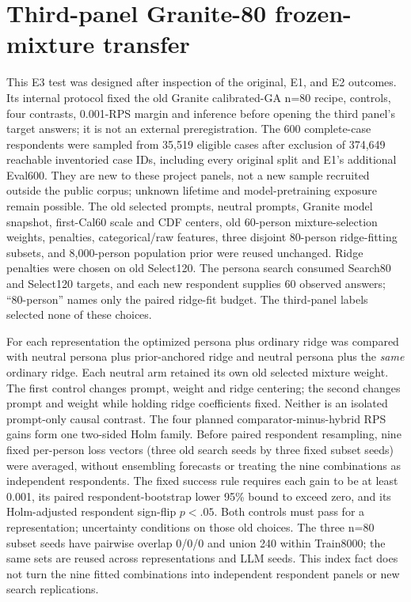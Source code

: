 \section{Third-panel Granite-80 frozen-mixture transfer}\label{sec:hybrid-transfer}
This E3 test was designed after inspection of the original, E1, and E2
outcomes. Its internal protocol fixed the old Granite calibrated-GA n=80
recipe, controls, four contrasts, 0.001-RPS margin and inference before
opening the third panel's target answers; it is not an external
preregistration. The 600 complete-case respondents were sampled from 35,519
eligible cases after exclusion of 374,649 reachable inventoried case IDs,
including every original split and E1's additional Eval600. They are new to
these project panels, not a new sample recruited outside the public corpus;
unknown lifetime and model-pretraining exposure remain possible. The old
selected prompts, neutral prompts, Granite model snapshot, first-Cal60 scale
and CDF centers, old 60-person mixture-selection weights, penalties,
categorical/raw features, three disjoint 80-person ridge-fitting subsets,
and 8,000-person population prior were reused unchanged. Ridge penalties
were chosen on old Select120. The persona search consumed Search80 and
Select120 targets, and each new respondent supplies 60 observed answers;
``80-person'' names only the paired ridge-fit budget. The third-panel labels
selected none of these choices.

For each representation the optimized persona plus ordinary ridge was
compared with neutral persona plus prior-anchored ridge and neutral persona
plus the \emph{same} ordinary ridge. Each neutral arm retained its own old
selected mixture weight. The first control changes prompt, weight and ridge
centering; the second changes prompt and weight while holding ridge
coefficients fixed. Neither is an isolated prompt-only causal contrast.
The four planned comparator-minus-hybrid RPS gains form one two-sided Holm
family. Before paired respondent resampling, nine fixed per-person loss
vectors (three old search seeds by three fixed subset seeds) were
averaged, without ensembling forecasts or treating the nine combinations as
independent respondents. The fixed success rule requires each gain to be at
least 0.001, its paired respondent-bootstrap lower 95\% bound to exceed zero,
and its Holm-adjusted respondent sign-flip $p<.05$. Both controls must pass
for a representation; uncertainty conditions on those old choices.
The three n=80 subset seeds have pairwise overlap 0/0/0 and union 240 within
Train8000; the same sets are reused across representations and LLM seeds.
This index fact does not turn the nine fitted combinations into independent
respondent panels or new search replications.

